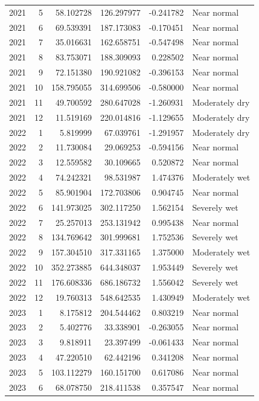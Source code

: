 \begin{tabular}{rrrrrl}
2021 & 5 & 58.102728 & 126.297977 & -0.241782 & Near normal \\
2021 & 6 & 69.539391 & 187.173083 & -0.170451 & Near normal \\
2021 & 7 & 35.016631 & 162.658751 & -0.547498 & Near normal \\
2021 & 8 & 83.753071 & 188.309093 & 0.228502 & Near normal \\
2021 & 9 & 72.151380 & 190.921082 & -0.396153 & Near normal \\
2021 & 10 & 158.795055 & 314.699506 & -0.580000 & Near normal \\
2021 & 11 & 49.700592 & 280.647028 & -1.260931 & Moderately dry \\
2021 & 12 & 11.519169 & 220.014816 & -1.129655 & Moderately dry \\
2022 & 1 & 5.819999 & 67.039761 & -1.291957 & Moderately dry \\
2022 & 2 & 11.730084 & 29.069253 & -0.594156 & Near normal \\
2022 & 3 & 12.559582 & 30.109665 & 0.520872 & Near normal \\
2022 & 4 & 74.242321 & 98.531987 & 1.474376 & Moderately wet \\
2022 & 5 & 85.901904 & 172.703806 & 0.904745 & Near normal \\
2022 & 6 & 141.973025 & 302.117250 & 1.562154 & Severely wet \\
2022 & 7 & 25.257013 & 253.131942 & 0.995438 & Near normal \\
2022 & 8 & 134.769642 & 301.999681 & 1.752536 & Severely wet \\
2022 & 9 & 157.304510 & 317.331165 & 1.375000 & Moderately wet \\
2022 & 10 & 352.273885 & 644.348037 & 1.953449 & Severely wet \\
2022 & 11 & 176.608336 & 686.186732 & 1.556042 & Severely wet \\
2022 & 12 & 19.760313 & 548.642535 & 1.430949 & Moderately wet \\
2023 & 1 & 8.175812 & 204.544462 & 0.803219 & Near normal \\
2023 & 2 & 5.402776 & 33.338901 & -0.263055 & Near normal \\
2023 & 3 & 9.818911 & 23.397499 & -0.061433 & Near normal \\
2023 & 4 & 47.220510 & 62.442196 & 0.341208 & Near normal \\
2023 & 5 & 103.112279 & 160.151700 & 0.617086 & Near normal \\
2023 & 6 & 68.078750 & 218.411538 & 0.357547 & Near normal \\

\end{tabular}
